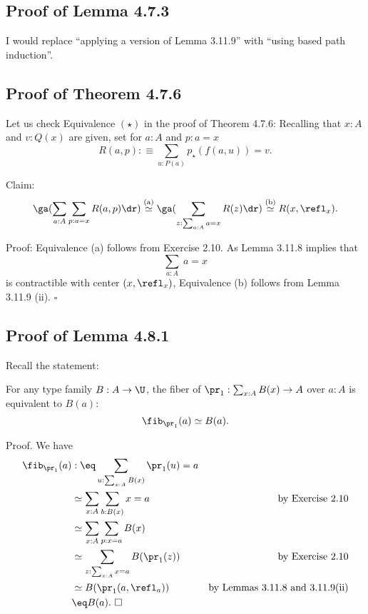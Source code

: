 \documentclass[12pt]{article}
\begin{document}


\subsection{Proof of Lemma 4.7.3}

I would replace ``applying a version of Lemma 3.11.9'' with ``using based path induction''.



\subsection{Proof of Theorem 4.7.6}

Let us check Equivalence $(\star)$ in the proof of Theorem 4.7.6: Recalling that $x:A$ and $v:Q(x)$ are given, set for $a:A$ and $p:a=x$ 
$$
R(a,p):\equiv\sum_{u:P(a)}p_\star(f(a,u))=v.
$$ 

Claim: 
$$
\ga(\sum_{a:A}\sum_{p:a=x}R(a,p)\dr)\overset{(\text a)}{\simeq}
\ga(\sum_{z:\sum_{a:A}a=x}R(z)\dr)\overset{(\text b)}{\simeq}
R(x,\refl_x).
$$

Proof: Equivalence (a) follows from Exercise 2.10. As Lemma 3.11.8 implies that 
$$
\sum_{a:A}\ a=x
$$ 
is contractible with center $(x,\refl_x)$, Equivalence (b) follows from Lemma 3.11.9 (ii). $\square$


\subsection{Proof of Lemma 4.8.1}%

Recall the statement:

For any type family $B:A\to\U$, the fiber of $\pr_1:\sum_{x:A}B(x)\to A$ over $a:A$ is equivalent to $B(a)$:
$$
\fib_{\pr_1}(a)\simeq B(a).
$$

Proof. We have
\begin{align*}
\fib_{\pr_1}(a)&:\eq\sum_{u:\sum_{x:A}B(x)}\pr_1(u)=a\\
&\simeq\sum_{x:A}\sum_{b:B(x)}x=a&\text{by Exercise 2.10}\\
&\simeq\sum_{x:A}\sum_{p:x=a}B(x)\\
&\simeq\sum_{z:\sum_{x:A}x=a}B(\pr_1(z))&\text{by Exercise 2.10}\\
&\simeq B(\pr_1(a,\refl_a))&\text{by Lemmas 3.11.8 and 3.11.9(ii)}\\
&\eq B(a).\ \square
\end{align*}
\end{document}
